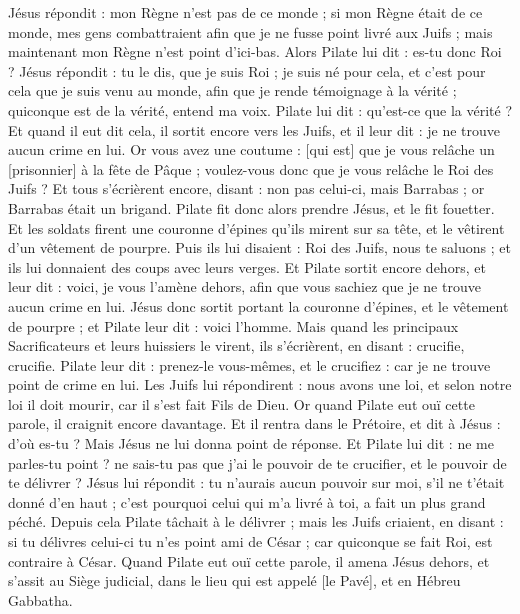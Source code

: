 \begin{multicols}{2}
Jésus répondit : mon Règne n'est pas de ce monde ; si mon Règne était de ce monde, mes gens combattraient afin que je ne fusse point livré aux Juifs ; mais maintenant mon Règne n'est point d'ici-bas.
Alors Pilate lui dit : es-tu donc Roi ? Jésus répondit : tu le dis, que je suis Roi ; je suis né pour cela, et c'est pour cela que je suis venu au monde, afin que je rende témoignage à la vérité ; quiconque est de la vérité, entend ma voix.
Pilate lui dit : qu'est-ce que la vérité ? Et quand il eut dit cela, il sortit encore vers les Juifs, et il leur dit : je ne trouve aucun crime en lui.
Or vous avez une coutume : [qui est] que je vous relâche un [prisonnier] à la fête de Pâque ; voulez-vous donc que je vous relâche le Roi des Juifs ?
Et tous s'écrièrent encore, disant : non pas celui-ci, mais Barrabas ; or Barrabas était un brigand.
\VerseOne{}Pilate fit donc alors prendre Jésus, et le fit fouetter.
Et les soldats firent une couronne d'épines qu'ils mirent sur sa tête, et le vêtirent d'un vêtement de pourpre.
Puis ils lui disaient : Roi des Juifs, nous te saluons ; et ils lui donnaient des coups avec leurs verges.
Et Pilate sortit encore dehors, et leur dit : voici, je vous l'amène dehors, afin que vous sachiez que je ne trouve aucun crime en lui.
Jésus donc sortit portant la couronne d'épines, et le vêtement de pourpre ; et Pilate leur dit : voici l'homme.
Mais quand les principaux Sacrificateurs et leurs huissiers le virent, ils s'écrièrent, en disant : crucifie, crucifie. Pilate leur dit : prenez-le vous-mêmes, et le crucifiez : car je ne trouve point de crime en lui.
Les Juifs lui répondirent : nous avons une loi, et selon notre loi il doit mourir, car il s'est fait Fils de Dieu.
Or quand Pilate eut ouï cette parole, il craignit encore davantage.
Et il rentra dans le Prétoire, et dit à Jésus : d'où es-tu ? Mais Jésus ne lui donna point de réponse.
Et Pilate lui dit : ne me parles-tu point ? ne sais-tu pas que j'ai le pouvoir de te crucifier, et le pouvoir de te délivrer ?
Jésus lui répondit : tu n'aurais aucun pouvoir sur moi, s'il ne t'était donné d'en haut ; c'est pourquoi celui qui m'a livré à toi, a fait un plus grand péché.
Depuis cela Pilate tâchait à le délivrer ; mais les Juifs criaient, en disant : si tu délivres celui-ci tu n'es point ami de César ; car quiconque se fait Roi, est contraire à César.
Quand Pilate eut ouï cette parole, il amena Jésus dehors, et s'assit au Siège judicial, dans le lieu qui est appelé [le Pavé], et en Hébreu Gabbatha.

\end{multicols}
